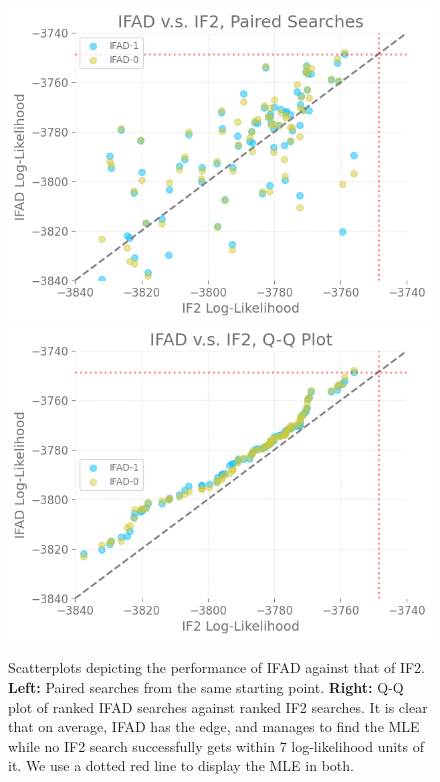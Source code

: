 \documentclass{article}
\begin{document}
\begin{figure}[htbp!]
    \centering
    \includegraphics[scale=0.53]{imgs/095/pairs.png}
    \includegraphics[scale=0.53]{imgs/095/qq.png}
    \caption{Scatterplots depicting the performance of IFAD against that of IF2. \textbf{Left:} Paired searches from the same starting point. \textbf{Right:} Q-Q plot of ranked IFAD searches against ranked IF2 searches. It is clear that on average, IFAD has the edge, and manages to find the MLE while no IF2 search successfully gets within 7 log-likelihood units of it. We use a dotted red line to display the MLE in both. }

    \label{fig:scatter}
\end{figure}
\end{document}
